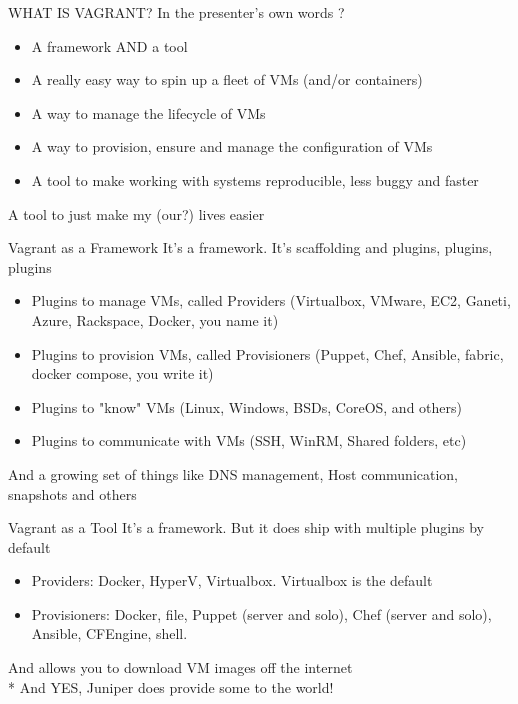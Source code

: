 \documentclass{beamer}
\begin{document}
    \begin{frame}{WHAT IS VAGRANT?}
	    In the presenter's own words ?
        \begin{itemize}
	    \pause \item A framework AND a tool
	    \pause \item A really easy way to spin up a fleet of VMs (and/or containers)
	    \pause \item A way to manage the lifecycle of VMs
	    \pause \item A way to provision, ensure and manage the configuration of VMs
	    \pause \item A tool to make working with systems reproducible, less buggy and faster
        \end{itemize}
	A tool to just make my (our?) lives easier
    \end{frame}

    \begin{frame}{Vagrant as a Framework}
	    It's a framework. It's scaffolding and plugins, plugins, plugins
        \begin{itemize}
		\pause \item Plugins to manage VMs, called Providers (Virtualbox, VMware, EC2, Ganeti, Azure, Rackspace, Docker, you name it)
		\pause \item Plugins to provision VMs, called Provisioners (Puppet, Chef, Ansible, fabric, docker compose, you write it)
		\pause \item Plugins to "know" VMs (Linux, Windows, BSDs, CoreOS, and others)
		\pause \item Plugins to communicate with VMs (SSH, WinRM, Shared folders, etc)
        \end{itemize}
	And a growing set of things like DNS management, Host communication, snapshots and others
    \end{frame}

    \begin{frame}{Vagrant as a Tool}
	    It's a framework. But it does ship with multiple plugins by default
        \begin{itemize}
		\pause \item Providers: Docker, HyperV, Virtualbox. Virtualbox is the default
		\pause \item Provisioners: Docker, file, Puppet (server and solo), Chef (server and solo), Ansible, CFEngine, shell.
        \end{itemize}
	\pause And allows you to download VM images off the internet
	\pause \\* And YES, Juniper does provide some to the world!
    \end{frame}
\end{document}
